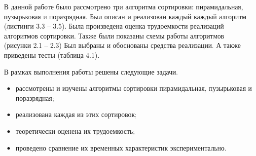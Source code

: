 \Conclusion %

В данной работе было рассмотрено три алгоритма сортировки: пирамидальная, пузырьковая и поразрядная. Был описан и реализован каждый каждый алгоритм (листинги 3.3 – 3.5). Была произведена оценка трудоемкости реализаций алгоритмов сортировки. Также были показаны схемы работы алгоритмов (рисунки 2.1 – 2.3) Был выбраны и обоснованы средства реализации. А также приведены тесты (таблица 4.1). 

В рамках выполнения работы решены следующие задачи.
\begin{itemize}
    \item рассмотрены и изучены алгоритмы сортировки пирамидальная, пузырьковая и поразрядная;
    \item реализована каждая из этих сортировок;
    \item теоретически оценена их трудоемкость;
    \item проведено сравнение их временных характеристик экспериментально.
\end{itemize}

 



